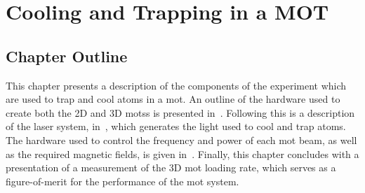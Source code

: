 \chapter{Cooling and Trapping in a MOT}
\section{Chapter Outline}
This chapter presents a description of the components of the experiment which
are used to trap and cool atoms in a \ac{mot}. An outline of the hardware used to create both the 2D and 3D \acp{mots} is presented in~. Following this is a description of the \Muquans laser system, in~, which generates the light used to cool and trap atoms. The hardware used to control the frequency and power of each \ac{mot} beam, as well as the required magnetic fields, is given in~. Finally, this chapter concludes with a presentation of a measurement of the 3D \ac{mot} loading rate, which serves as a figure-of-merit for the performance of the \ac{mot} system. 
